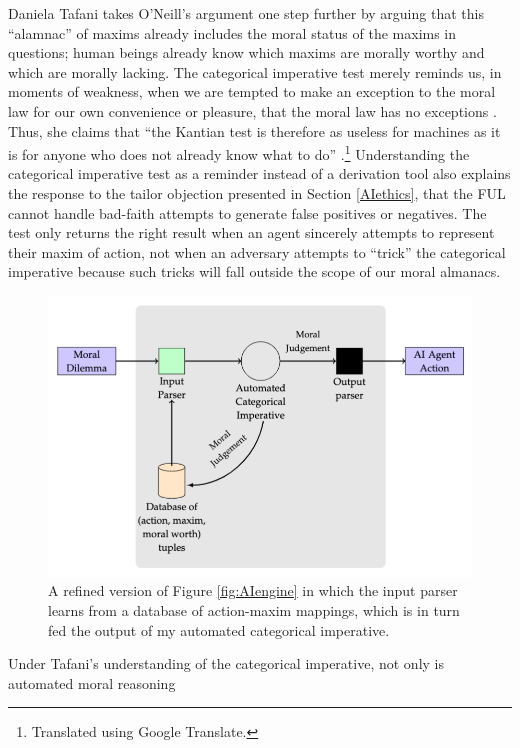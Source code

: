 \begin{isabellebody}
\begin{isamarkuptext}
Daniela Tafani takes O'Neill's argument one step further by arguing that this ``alamnac'' of maxims already 
includes the moral status of the maxims in questions; human beings already
know which maxims are morally worthy and which are morally lacking. The categorical imperative test
merely reminds us, in moments of weakness, when we are tempted to make an exception to the moral law for 
our own convenience or pleasure, that the moral law has no exceptions \citep[9]{tafani}. Thus, she claims
that ``the Kantian test is therefore as useless for machines as it is for anyone who does
not already know what to do'' \citep[8]{tafani}.\footnote{Translated using Google Translate.} 
Understanding the categorical imperative test as a reminder
instead of a derivation tool also explains the response to the tailor objection presented in Section \ref{AIethics}, that the FUL cannot 
handle bad-faith attempts to generate false positives or negatives. The test only returns the right 
result when an agent sincerely attempts to represent their maxim of action, not when an adversary attempts
 to ``trick'' the categorical imperative because such tricks will fall outside the scope of our moral 
almanacs.%
\end{isamarkuptext}\isamarkuptrue%
%
\begin{figure}
\centering
\includegraphics[scale=0.47]{inputparser.png}
\caption{A refined version of Figure \ref{fig:AIengine} in which the input parser learns from a database
of action-maxim mappings, which is in turn fed the output of my automated categorical imperative. } \label{fig:inputparser}
\end{figure}
%
\begin{isamarkuptext}%
Under Tafani's understanding of the categorical imperative, not only is automated moral reasoning

\end{isamarkuptext}
\end{isabellebody}

